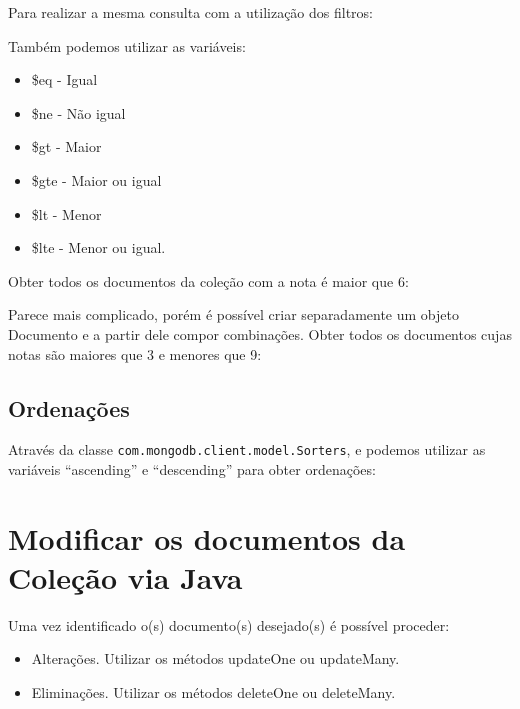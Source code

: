 Para realizar a mesma consulta com a utilização dos filtros: \\

Também podemos utilizar as variáveis: 
\begin{itemize}[nolistsep]
	\item \$eq - Igual
	\item \$ne - Não igual
	\item \$gt - Maior
	\item \$gte - Maior ou igual
	\item \$lt - Menor
	\item \$lte - Menor ou igual. 
\end{itemize}

Obter todos os documentos da coleção com a nota é maior que 6: \\

Parece mais complicado, porém é possível criar separadamente um objeto Documento e a partir dele compor combinações. Obter todos os documentos cujas notas são maiores que 3 e menores que 9: \\

\subsection{Ordenações}
Através da classe \texttt{com.mongodb.client.model.Sorters}, e podemos utilizar as variáveis ``ascending'' e ``descending'' para obter ordenações: \\

\section{Modificar os documentos da Coleção via Java}
Uma vez identificado o(s) documento(s) desejado(s) é possível proceder:
\begin{itemize}[nolistsep]
	\item Alterações. Utilizar os métodos updateOne ou updateMany.
	\item Eliminações. Utilizar os métodos deleteOne ou deleteMany.
\end{itemize}

